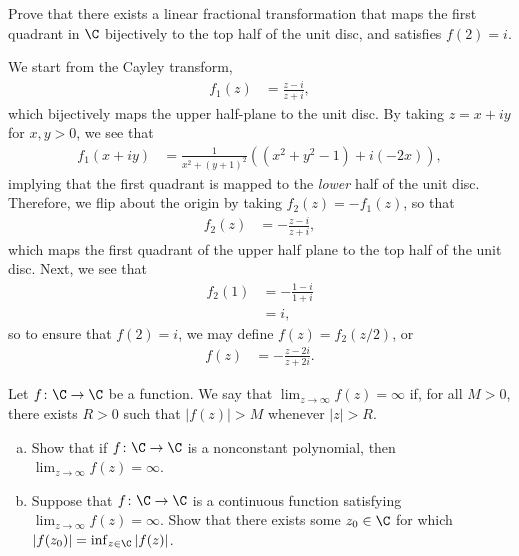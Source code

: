 \documentclass[10pt]{mypackage}
\begin{document}
\begin{problem}[Problem 3]
  Prove that there exists a linear fractional transformation that maps the first quadrant in $\C$ bijectively to the top half of the unit disc, and satisfies $f(2) = i$.
\end{problem}
\begin{solution}
  We start from the Cayley transform,
  \begin{align*}
    f_1(z) &= \frac{z-i}{z+i},
  \end{align*}
  which bijectively maps the upper half-plane to the unit disc. By taking $z = x + iy$ for $ x,y > 0$, we see that
  \begin{align*}
    f_1\left( x+iy \right) &= \frac{1}{x^2 + \left( y+1 \right)^2}\left( \left( x^2 + y^2 - 1 \right) + i\left( -2x \right) \right),
  \end{align*}
  implying that the first quadrant is mapped to the \textit{lower} half of the unit disc. Therefore, we flip about the origin by taking $f_2(z) = -f_1(z)$, so that
  \begin{align*}
    f_2(z) &= -\frac{z-i}{z+i},
  \end{align*}
  which maps the first quadrant of the upper half plane to the top half of the unit disc. Next, we see that
  \begin{align*}
    f_2(1) &= -\frac{1-i}{1+i}\\
           &= i,
  \end{align*}
  so to ensure that $f(2) = i$, we may define $f(z) = f_2(z/2)$, or
  \begin{align*}
    f(z) &= -\frac{z-2i}{z+2i}.
  \end{align*}
\end{solution}
\begin{problem}[Problem 4]
  Let $f\colon \C\rightarrow \C$ be a function. We say that $\lim_{z\rightarrow\infty}f(z) = \infty$ if, for all $M > 0$, there exists $R > 0$ such that $\left\vert f(z)  \right\vert > M$ whenever $\left\vert z \right\vert > R$.
  \begin{enumerate}[(a)]
    \item Show that if $f\colon \C\rightarrow \C$ is a nonconstant polynomial, then $\lim_{z\rightarrow\infty}f(z) = \infty$.
    \item Suppose that $f\colon \C\rightarrow \C$ is a continuous function satisfying $\lim_{z\rightarrow\infty}f(z) = \infty$. Show that there exists some $z_0\in \C$ for which $\left\vert f(z_0) \right\vert = \inf_{z\in \C} \left\vert f(z) \right\vert$.
  \end{enumerate}
\end{problem}
\end{document}
